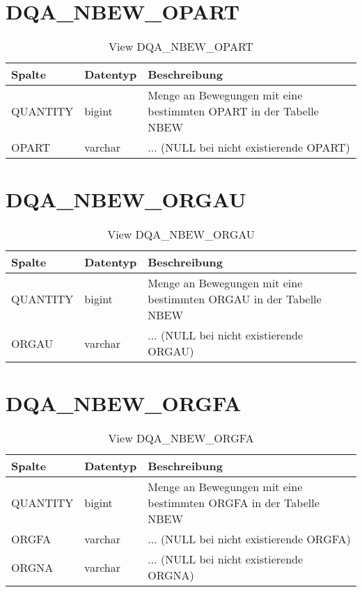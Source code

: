   \section{DQA\_NBEW\_OPART}

  \begin{table}[ht]
    \centering
    \caption{View DQA\_NBEW\_OPART}
    \label{tab:dqanbewopart}
    \begin{tabular}{||l|l|p{10cm}||}
      \hline
      Spalte & Datentyp & Beschreibung \\ [0.5ex] \hline \hline
QUANTITY & bigint & Menge an Bewegungen mit eine bestimmten OPART in der Tabelle NBEW \\ \hline
OPART & varchar & ... (NULL bei nicht existierende OPART)\\ \hline
    \end{tabular}
  \end{table}
 \clearpage
  \section{DQA\_NBEW\_ORGAU}

  \begin{table}[ht]
    \centering
    \caption{View DQA\_NBEW\_ORGAU}
    \label{tab:dqanbeworgau}
    \begin{tabular}{||l|l|p{10cm}||}
      \hline
      Spalte & Datentyp & Beschreibung \\ [0.5ex] \hline \hline
QUANTITY & bigint & Menge an Bewegungen mit eine bestimmten ORGAU in der Tabelle NBEW \\ \hline
ORGAU & varchar & ... (NULL bei nicht existierende ORGAU)\\ \hline
    \end{tabular}
  \end{table}
 \clearpage
  \section{DQA\_NBEW\_ORGFA}

  \begin{table}[ht]
    \centering
    \caption{View DQA\_NBEW\_ORGFA}
    \label{tab:dqanbeworgfa}
    \begin{tabular}{||l|l|p{10cm}||}
      \hline
      Spalte & Datentyp & Beschreibung \\ [0.5ex] \hline \hline
QUANTITY & bigint & Menge an Bewegungen mit eine bestimmten ORGFA in der Tabelle NBEW \\ \hline
ORGFA & varchar & ... (NULL bei nicht existierende ORGFA)\\ \hline
ORGNA & varchar & ... (NULL bei nicht existierende ORGNA)\\ \hline
    \end{tabular}
  \end{table}
 \clearpage
